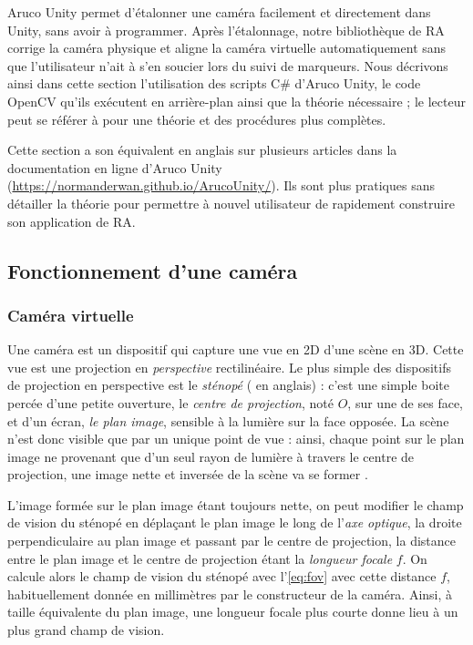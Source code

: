Aruco Unity permet d'étalonner une caméra facilement et directement dans Unity, sans avoir à programmer. Après l'étalonnage, notre bibliothèque de RA corrige la caméra physique et aligne la caméra virtuelle automatiquement sans que l'utilisateur n'ait à s'en soucier lors du suivi de marqueurs. Nous décrivons ainsi dans cette section l'utilisation des scripts C\# d'Aruco Unity, le code OpenCV qu'ils exécutent en arrière-plan ainsi que la théorie nécessaire ; le lecteur peut se référer à \cite[chap. 18-19]{Kaehler2017} pour une théorie et des procédures plus complètes.

Cette section a son équivalent en anglais sur plusieurs articles dans la documentation en ligne d'Aruco Unity (\url{https://normanderwan.github.io/ArucoUnity/}). Ils sont plus pratiques sans détailler la théorie pour permettre à nouvel utilisateur de rapidement construire son application de RA.

\subsection{Fonctionnement d'une caméra}
\label{subsec:camera_theory}

\subsubsection{Caméra virtuelle}
Une caméra est un dispositif qui capture une vue en 2D d'une scène en 3D. Cette vue est une projection en \emph{perspective} rectilinéaire. Le plus simple des dispositifs de projection en perspective est le \emph{sténopé} ( en anglais) : c'est une simple boite percée d'une petite ouverture, le \emph{centre de projection}, noté $O$, sur une de ses face, et d'un écran, \emph{le plan image}, sensible à la lumière sur la face opposée. La scène n'est donc visible que par un unique point de vue : ainsi, chaque point sur le plan image ne provenant que d'un seul rayon de lumière à travers le centre de projection, une image nette et inversée de la scène va se former .


L'image formée sur le plan image étant toujours nette, on peut modifier le champ de vision du sténopé en déplaçant le plan image le long de l'\emph{axe optique}, la droite perpendiculaire au plan image et passant par le centre de projection, la distance entre le plan image et le centre de projection étant la \emph{longueur focale} $f$. On calcule alors le champ de vision du sténopé avec l'\autoref{eq:fov} avec cette distance $f$, habituellement donnée en millimètres par le constructeur de la caméra. Ainsi, à taille équivalente du plan image, une longueur focale plus courte donne lieu à un plus grand champ de vision.

